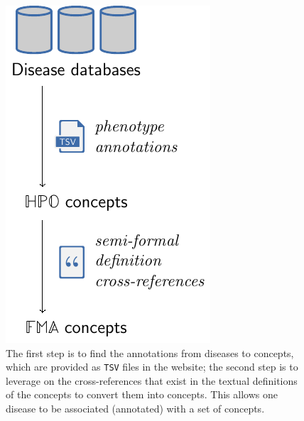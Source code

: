\begin{figure}
    \centering
    \includegraphics{images/disease2fma.pdf}
    \caption[Workflow to find  annotations for some diseases]{The first step is to find the annotations from diseases to  concepts, which are provided as \texttt{TSV} files in the  website; the second step is to leverage on the cross-references that exist in the textual definitions of the  concepts to convert them into  concepts. This allows one disease to be associated (\ie annotated) with a set of  concepts.}
    \label{fig:disease2fma}
\end{figure}

